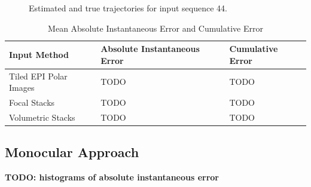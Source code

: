 \begin{figure}[H]
{    }
    \caption{Estimated and true trajectories for input sequence 44.}
    \setcounter{subfigure}{0}
\end{figure}

\begin{table}[htbp]
    \caption{Mean Absolute Instantaneous Error and Cumulative Error}
    \centering
    \begin{tabular}{@{}lll@{}}
        \toprule
        Input Method        & Absolute Instantaneous Error   & Cumulative Error  \\
        \midrule 
        Tiled EPI Polar Images & TODO & TODO \\
        Focal Stacks & TODO & TODO \\
        Volumetric Stacks & TODO & TODO \\
        \bottomrule
        
    \end{tabular}
\end{table}


\subsection{Monocular Approach}

\textbf{TODO: histograms of absolute instantaneous error}


